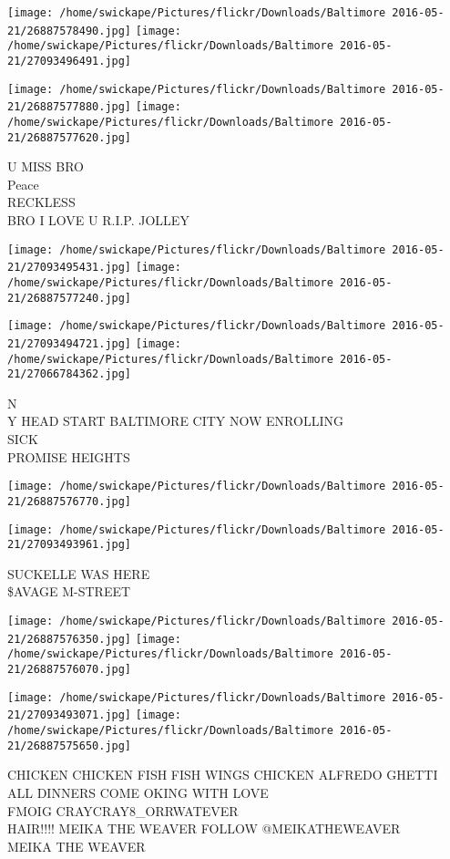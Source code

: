 \documentclass[10pt,letterpaper]{article}
\begin{document}
\texttt{[image: /home/swickape/Pictures/flickr/Downloads/Baltimore 2016-05-21/26887578490.jpg]}
\texttt{[image: /home/swickape/Pictures/flickr/Downloads/Baltimore 2016-05-21/27093496491.jpg]}

\texttt{[image: /home/swickape/Pictures/flickr/Downloads/Baltimore 2016-05-21/26887577880.jpg]}
\texttt{[image: /home/swickape/Pictures/flickr/Downloads/Baltimore 2016-05-21/26887577620.jpg]}

U MISS BRO\\
Peace\\
RECKLESS\\
BRO I LOVE U R.I.P. JOLLEY
\pagebreak

\texttt{[image: /home/swickape/Pictures/flickr/Downloads/Baltimore 2016-05-21/27093495431.jpg]}
\texttt{[image: /home/swickape/Pictures/flickr/Downloads/Baltimore 2016-05-21/26887577240.jpg]}

\texttt{[image: /home/swickape/Pictures/flickr/Downloads/Baltimore 2016-05-21/27093494721.jpg]}
\texttt{[image: /home/swickape/Pictures/flickr/Downloads/Baltimore 2016-05-21/27066784362.jpg]}

N\\
Y HEAD START BALTIMORE CITY NOW ENROLLING\\
SICK\\
PROMISE HEIGHTS
\pagebreak

\texttt{[image: /home/swickape/Pictures/flickr/Downloads/Baltimore 2016-05-21/26887576770.jpg]}

\vspace{0.25in}
\texttt{[image: /home/swickape/Pictures/flickr/Downloads/Baltimore 2016-05-21/27093493961.jpg]}

SUCKELLE WAS HERE\\
\$AVAGE M{-}STREET
\pagebreak

\texttt{[image: /home/swickape/Pictures/flickr/Downloads/Baltimore 2016-05-21/26887576350.jpg]}
\texttt{[image: /home/swickape/Pictures/flickr/Downloads/Baltimore 2016-05-21/26887576070.jpg]}

\texttt{[image: /home/swickape/Pictures/flickr/Downloads/Baltimore 2016-05-21/27093493071.jpg]}
\texttt{[image: /home/swickape/Pictures/flickr/Downloads/Baltimore 2016-05-21/26887575650.jpg]}

CHICKEN CHICKEN FISH FISH WINGS CHICKEN ALFREDO GHETTI ALL DINNERS COME OKING WITH LOVE\\
FMOIG CRAYCRAY8\_ORRWATEVER\\
HAIR!!!! MEIKA THE WEAVER FOLLOW @MEIKATHEWEAVER\\
MEIKA THE WEAVER
\pagebreak
\end{document}
